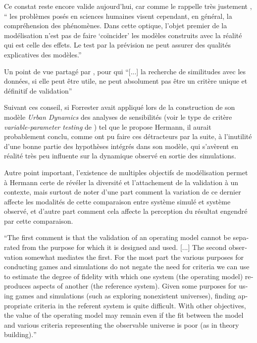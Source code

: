 Ce constat reste encore valide aujourd'hui, car comme le rappelle très justement \textcite[32]{Bulle2005}, \enquote{ les problèmes posés en sciences humaines visent cependant, en général, la compréhension des phénomènes. Dans cette optique, l’objet premier de la modélisation n’est pas de faire \enquote{coïncider} les modèles construits avec la réalité qui est celle des effets. Le test par la prévision ne peut assurer des qualités explicatives des modèles.}

Un point de vue partagé par \textcite[106]{Amblard2006}, pour qui \enquote{[...] la recherche de similitudes avec les données, si elle peut être utile, ne peut absolument pas être un critère unique et définitif de validation}

Suivant ces conseil, si Forrester avait appliqué lors de la construction de son modèle \textit{Urban Dynamics} des analyses de sensibilités (voir le type de critère \textit{variable-parameter testing} de \autocite{Hermann1967}) tel que le propose Hermann, il aurait probablement conclu, comme ont pu faire ces détracteurs par la suite, à l'inutilité d'une bonne partie des hypothèses intégrés dans son modèle, qui s'avèrent en réalité très peu influente sur la dynamique observé en sortie des simulations.

Autre point important, l'existence de multiples objectifs de modélisation permet à Hermann certe de révéler la diversité et l'attachement de la validation à un contexte, mais surtout de noter d'une part comment la variation de ce dernier affecte les modalités de cette comparaison entre système simulé et système observé, et d'autre part comment cela affecte la perception du résultat engendré par cette comparaison.

\foreignquote{english}{The first comment is that the validation of an operating model cannot be separated from the purpose for which it is designed and used. [...] The second observation somewhat mediates the first. For the most part the various purposes for conducting games and simulations do not negate the need for criteria we can use to estimate the degree of fidelity with which one system (the operating model) reproduces aspects of another (the reference system). Given some purposes for using games and simulations (such as exploring nonexistent universes), finding appropriate criteria in the referent system is quite difficult. With other objectives, the value of the operating model may remain even if the fit between the model and various criteria representing the observable universe is poor (as in theory building).} \autocite[219]{Hermann1967}

